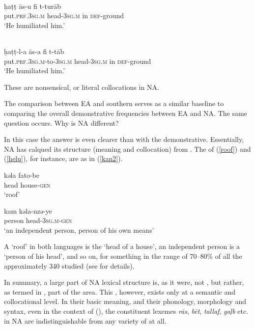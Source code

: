 \documentclass[output=paper]{langsci/langscibook}
\begin{document}
\ea
\ea {}  \\
\gll ḥaṭṭ {\R}ās-u fi t-turāb\\
     put.\textsc{prf.3sg.m} head-\textsc{3sg.m} in \textsc{def}{}-ground\\
\glt ‘He humiliated him.’ \label{egy}

\ex {}  \\
\gll ḥaṭṭ-l-a {\R}ās-a fi t-t{\R}āb\\
     put.\textsc{prf.3sg.m}-to-\textsc{3sg.m} head-\textsc{3sg.m} in \textsc{def}{}-ground\\
\glt ‘He humiliated him.’ \label{tun}
\z
\z

These are nonsensical, or literal collocations in NA.

The comparison between EA and southern   serves as a similar baseline to comparing the overall demonstrative frequencies between EA and NA. The same question occurs. Why is NA different?


In this case the answer is even clearer than with the demonstrative. Essentially, NA has calqued its  structure (meaning and collocation) from . The  of (\ref{roof}) and (\ref{helu}), for instance, are as in (\ref{kan2}).

\ea\label{kan2}
\ea
\gll kəla fato-be\\
     head house-\textsc{gen}\\
\glt ‘roof’\label{fato}

\ex
\gll kam kəla-nzə-ye\\
     person head-\textsc{3sg.m}{}-\textsc{gen}\\
\glt ‘an independent person, person of his own means’\label{kam}
\z
\z

A ‘roof’ in both languages is the ‘head of a house’, an independent person is a ‘person of his head’, and so on, for something in the range of 70–80\% of all the approximately 340  studied (see \citealt{Owens1996,Owens2014,Owens2015,Owens2016idioms} for details).

In summary, a large part of NA lexical structure is, as it were, not , but rather, as termed in \citet{Owens1998}, part of the   area. This , however, exists only at a semantic and collocational level. In their basic meaning, and their phonology, morphology and syntax, even in the context of  (\citealt{OwensDodsworth2017}), the constituent lexemes \textit{rās}, \textit{bēt}, \textit{tallaf}, \textit{gaḷb} etc. in NA are indistinguishable from any variety of  at all.
\end{document}
